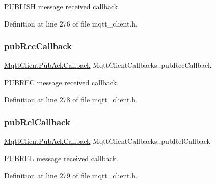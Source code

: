 P\+U\+B\+L\+I\+SH message received callback. 



Definition at line 276 of file mqtt\+\_\+client.\+h.

\mbox{\label{structMqttClientCallbacks_a06d03fb2617a953dec60137af47ebc6b}} 
\subsubsection{\texorpdfstring{pub\+Rec\+Callback}{pubRecCallback}}
{\footnotesize\ttfamily \hyperlink{mqtt__client_8h_a795fdcc921902cd871b766c91770a469}{Mqtt\+Client\+Pub\+Ack\+Callback} Mqtt\+Client\+Callbacks\+::pub\+Rec\+Callback}



P\+U\+B\+R\+EC message received callback. 



Definition at line 278 of file mqtt\+\_\+client.\+h.

\mbox{\label{structMqttClientCallbacks_a74ba3af4ff2df7cd983b4862c7666f7d}} 
\subsubsection{\texorpdfstring{pub\+Rel\+Callback}{pubRelCallback}}
{\footnotesize\ttfamily \hyperlink{mqtt__client_8h_a795fdcc921902cd871b766c91770a469}{Mqtt\+Client\+Pub\+Ack\+Callback} Mqtt\+Client\+Callbacks\+::pub\+Rel\+Callback}



P\+U\+B\+R\+EL message received callback. 



Definition at line 279 of file mqtt\+\_\+client.\+h.

\mbox{\label{structMqttClientCallbacks_abef00851966d05a2dfbf1526ec778d6d}} 
